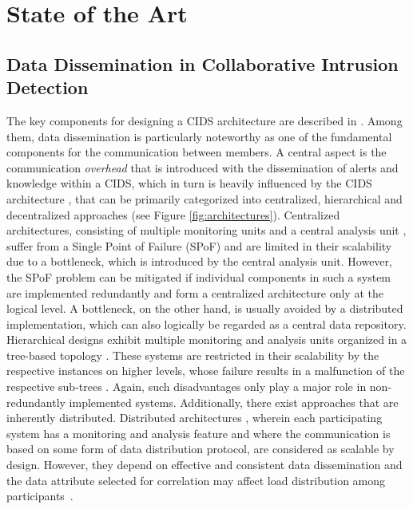 \chapter{State of the Art}

\section{Data Dissemination in Collaborative Intrusion Detection}

The key components for designing a CIDS architecture are described in \cite[p. 34]{vasilomanolakis_collaborative_2016}. Among them, data dissemination is particularly noteworthy as one of the fundamental components for the communication between members. A central aspect is the communication \textit{overhead} that is introduced with the dissemination of alerts and knowledge within a CIDS, which in turn is heavily influenced by the CIDS architecture \cite[p.39]{vasilomanolakis_collaborative_2016}, that can be primarily categorized into centralized, hierarchical and decentralized approaches \cite{Zhou2010} (see Figure \ref{fig:architectures}). Centralized architectures, consisting of multiple monitoring units and a central analysis unit \cite{Cuppens2002}\cite{Miller2003}, suffer from a Single Point of Failure (SPoF) and are limited in their scalability due to a bottleneck, which is introduced by the central analysis unit. However, the SPoF problem can be mitigated if individual components in such a system are implemented redundantly and form a centralized architecture only at the logical level. A bottleneck, on the other hand, is usually avoided by a distributed implementation, which can also logically be regarded as a central data repository. Hierarchical designs exhibit multiple monitoring and analysis units organized in a tree-based topology \cite{Phillip1997,Zhang2001,Nguyen2019}. These systems are restricted in their scalability by the respective instances on higher levels, whose failure results in a malfunction of the respective sub-trees \cite{Zhou2010}. Again, such disadvantages only play a major role in non-redundantly implemented systems. Additionally, there exist approaches that are inherently distributed. Distributed architectures \cite{Vasilomanolakis2015SkipMon,Perez2013,Bye2008,Fung2008,Janakiraman2003}, wherein each participating system has a monitoring and analysis feature and where the communication is based on some form of data distribution protocol, are considered as scalable by design. However, they depend on effective and consistent data dissemination and the data attribute selected for correlation may affect load distribution among participants~\cite{Zhou2010}.

